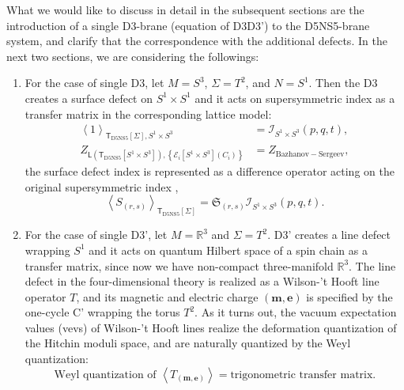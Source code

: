 What we would like to discuss in detail in the subsequent sections
are the introduction of a single D3-brane (equation of D3D3') to the
D5NS5-brane system, and clarify that the correspondence with the additional
defects. In the next two sections, we are considering the followings:
\begin{enumerate}
	\item For the case of single D3, let $M=S^{3}$, $\Sigma=T^{2}$, and $N=S^{1}$.
Then the D3 creates a surface defect on $S^{1}\times S^{1}$ and it
acts on supersymmetric index as a transfer matrix in the corresponding
lattice model:
\begin{align}
  \left\langle  1  \right\rangle_{\mathsf{T}_{\mathrm{D5NS5}}\left[\Sigma\right],S^{1}\times S^{3}}
    &  =  \mathcal{I}_{S^{1}\times S^{3}}\left(p,q,t\right),\\
  Z_{\mathsf{L}\left(\mathsf{T}_{\mathrm{D5NS5}}\left[S^{1}\times S^{3}\right]\right),\left\{ \mathcal{E}_{i}\left[S^{1}\times S^{3}\right]\left(C_{i}\right)\right\} }
    &  =  Z_{\mathrm{Bazhanov-Sergeev}},
\end{align}
 the surface defect index is represented as a difference operator
acting on the original supersymmetric index \cite{Gaiotto:2012xa,Gadde:2013dda},
\begin{equation}
  \left\langle S_{\left(r,s\right)}\right\rangle_{\mathsf{T}_{\mathrm{D5NS5}}\left[\Sigma\right]}
  =  \mathfrak{S}_{\left(r,s\right)}\mathcal{I}_{S^{1}\times S^{3}}\left(p,q,t\right).
\end{equation}
\item For the case of single D3', let $M=\mathbb{R}^{3}$ and $\Sigma=T^{2}$.
D3' creates a line defect wrapping $S^{1}$ and it acts on quantum
Hilbert space of a spin chain as a transfer matrix, since now we have
non-compact three-manifold $\mathbb{R}^{3}$. The line defect in the
four-dimensional theory is realized as a Wilson-'t Hooft line operator
$T$, and its magnetic and electric charge $\left(\mathbf{m},\mathbf{e}\right)$
is specified by the one-cycle C' wrapping the torus $T^{2}$. As it
turns out, the vacuum expectation values (vevs) of Wilson-'t Hooft
lines realize the deformation quantization of the Hitchin moduli space,
and are naturally quantized by the Weyl quantization:
\begin{equation}
  \textrm{Weyl quantization of }  \left\langle  T_{\left(\mathbf{m},\mathbf{e}\right)}  \right\rangle
  =  \textrm{trigonometric transfer matrix.}
\end{equation}
\end{enumerate}
%




















